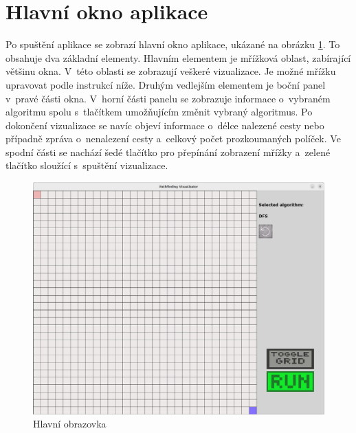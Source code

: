 \documentclass[12pt]{report}			%
\begin{document}
			\section{Hlavní okno aplikace}
						Po spuštění aplikace se zobrazí hlavní okno aplikace, ukázané na obrázku \ref{menu}. To obsahuje dva základní elementy. Hlavním elementem je mřížková oblast, zabírající většinu okna. V~této oblasti se zobrazují veškeré vizualizace. Je možné mřížku upravovat podle instrukcí níže. Druhým vedlejším elementem je boční panel v~pravé části okna. V~horní části panelu se zobrazuje informace o~vybraném algoritmu spolu s~tlačítkem umožňujícím změnit vybraný algoritmus. Po dokončení vizualizace se navíc objeví informace o~délce nalezené cesty nebo případně zpráva o~nenalezení cesty a~celkový počet prozkoumaných políček. Ve spodní části se nachází šedé tlačítko pro přepínání zobrazení mřížky a~zelené tlačítko sloužící s~spuštění vizualizace. 
						
			\begin{figure}[h]
  			\centering 
  			\includegraphics[width = \textwidth]{menu.png}
  			\caption{Hlavní obrazovka}
  			\label{menu}
  			\end{figure}
  			
\end{document}
